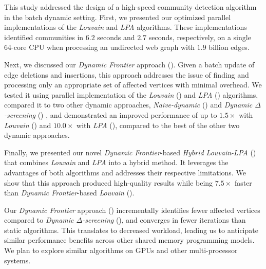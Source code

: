 This study addressed the design of a high-speed community detection algorithm in the batch dynamic setting. First, we presented our optimized parallel implementations of the \textit{Louvain} and \textit{LPA} algorithms. These implementations identified communities in $6.2$ seconds and $2.7$ seconds, respectively, on a single 64-core CPU when processing an undirected web graph with $1.9$ billion edges.

Next, we discussed our \textit{Dynamic Frontier} approach (\Fro{}). Given a batch update of edge deletions and insertions, this approach addresses the issue of finding and processing only an appropriate set of affected vertices with minimal overhead. We tested it using parallel implementation of the \textit{Louvain} (\FroLou{}) and \textit{LPA} (\FroLPA{}) algorithms, compared it to two other dynamic approaches, \textit{Naive-dynamic} (\Nai{}) and \textit{Dynamic $\Delta$-screening} (\Del{}) \cite{com-zarayeneh21}, and demonstrated an improved performance of up to $1.5\times$ with \textit{Louvain} (\FroLou{}) and $10.0\times$ with \textit{LPA} (\FroLPA{}), compared to the best of the other two dynamic approaches.

Finally, we presented our novel \textit{Dynamic Frontier}-based \textit{Hybrid Louvain-LPA} (\FroHyb{}) that combines \textit{Louvain} and \textit{LPA} into a hybrid method. It leverages the advantages of both algorithms and addresses their respective limitations. We show that this approach produced high-quality results while being $7.5\times$ faster than \textit{Dynamic Frontier}-based \textit{Louvain} (\FroLou{}).

Our \textit{Dynamic Frontier} approach (\Fro{}) incrementally identifies fewer affected vertices compared to \textit{Dynamic $\Delta$-screening} (\Del{}), and converges in fewer iterations than static algorithms. This translates to decreased workload, leading us to anticipate similar performance benefits across other shared memory programming models. We plan to explore similar algorithms on GPUs and other multi-processor systems.
